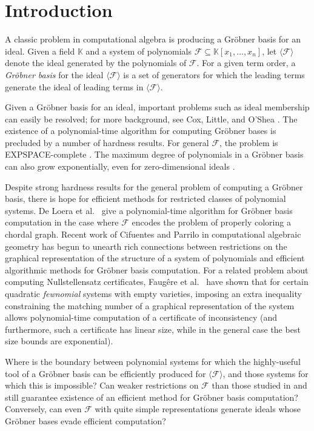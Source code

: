 \documentclass{article}
\newcommand{\F}[0]{\mathcal{F}}
\newcommand{\K}[0]{\mathbb{K}}
\begin{document}
\section{Introduction}
A classic problem in computational algebra is producing a Gr\"{o}bner basis for an ideal. Given a field $\K$ and a system of polynomials $\F\subseteq \K[x_1,\ldots,x_n]$, let $\langle \F\rangle$ denote the ideal generated by the polynomials of $\F$. For a given term order, a \emph{Gr\"{o}bner basis} for the ideal $\langle \F\rangle$ is a set of generators for which the leading terms generate the ideal of leading terms in $\langle \F\rangle$.

Given a Gr\"{o}bner basis for an ideal, important problems such as ideal membership can easily be resolved; for more background, see Cox, Little, and O'Shea \cite{cox}.
The existence of a polynomial-time algorithm for computing Gr\"{o}bner bases is precluded by a number of hardness results. For general $\F$, the problem is EXPSPACE-complete \cite{kuehnle, mayr:survey}. The maximum degree of polynomials in a Gr\"{o}bner basis can also grow exponentially, even for zero-dimensional ideals \cite{giusti,mayr,moller,ritscher}.

Despite strong hardness results for the general problem of computing a Gr\"{o}bner basis, there is hope for efficient methods for restricted classes of polynomial systems. De Loera et al.~\cite{deloera} give a polynomial-time algorithm for Gr\"{o}bner basis computation in the case where $\F$ encodes the problem of properly coloring a chordal graph. Recent work of Cifuentes and Parrilo \cite{parrilo} in computational algebraic geometry has begun to unearth rich connections between restrictions on the graphical representation of the structure of a system of polynomials and efficient algorithmic methods for Gr\"{o}bner basis computation. For a related problem about computing Nullstellensatz certificates, Faug\^ere et al.~\cite{Faugere} have shown that for certain quadratic \textit{fewnomial} systems with empty varieties, imposing an extra inequality constraining the matching number of a graphical representation of the system allows polynomial-time computation of a certificate of inconsistency (and furthermore, such a certificate has linear size, while in the general case the best size bounds are exponential).

Where is the boundary between polynomial systems for which the highly-useful tool of a Gr\"{o}bner basis can be efficiently produced for $\langle \F\rangle$, and those systems for which this is impossible? Can weaker restrictions on $\F$ than those studied in \cite{parrilo} and \cite{deloera} still guarantee existence of an efficient method for Gr\"{o}bner basis computation? Conversely, can even $\F$ with quite simple representations generate ideals whose Gr\"{o}bner bases  evade efficient computation?
\end{document}
